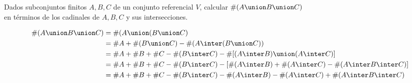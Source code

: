 \begin{enunciado}{\ejercicio}
  Dados subconjuntos finitos $A, B, C$ de un conjunto referencial $V$, calcular $\#(A \union B \union C)$\\
  en términos de los cadinales de $A, B, C$ y sus intersecciones.
\end{enunciado}

\begin{align*}
  \#(A \union B \union C) & = \#(A \union (B \union C)                                                                       \\
                          & = \#A + \#(B \union C) - \#(A \inter (B \union C))                                               \\
                          & = \#A + \#B + \#C - \#(B \inter C) - \#[(A \inter B) \union (A \inter C)]                        \\
                          & = \#A + \#B + \#C - \#(B \inter C) - [\#(A \inter B) + \#(A \inter C) - \#(A \inter B \inter C)] \\
                          & = \#A + \#B + \#C - \#(B \inter C) - \#(A \inter B) - \#(A \inter C) + \#(A \inter B \inter C)
\end{align*}

